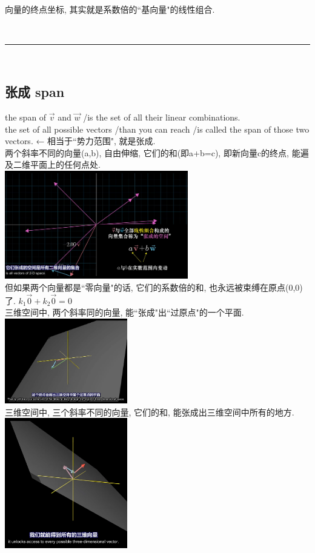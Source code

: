 \documentclass[UTF8]{ctexart}
\begin{document}
向量的终点坐标, 其实就是系数倍的``基向量"的线性组合.

~\\
\hrule
~\\

\subsection{张成 span}

the span of $\vec{v}$ and $\vec{w} $  /is the set of  all their linear combinations.\\
the set of all possible vectors /than you can reach /is called the span of those two vectors. ← 相当于``势力范围", 就是张成.\\


两个斜率不同的向量(a,b), 自由伸缩, 它们的和(即a+b=c), 即新向量c的终点, 能遍及二维平面上的任何点处.\\

\includegraphics[width=0.6\textwidth]{img/0070.png}\\

但如果两个向量都是``零向量"的话, 它们的系数倍的和, 也永远被束缚在原点(0,0)了. $ k_1 \vec{0}  +  k_2 \vec{0}=0$ \\

三维空间中, 两个斜率同的向量, 能``张成"出``过原点"的一个平面.\\
\includegraphics[width=0.4\textwidth]{img/0071.png}\\

三维空间中, 三个斜率不同的向量, 它们的和, 能张成出三维空间中所有的地方. \\
\includegraphics[width=0.4\textwidth]{img/0072.png}\\
\end{document}
